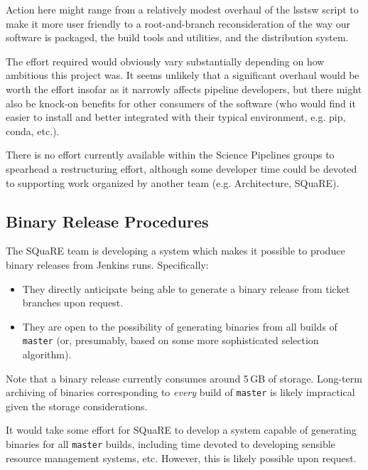 \documentclass[DM,toc]{lsstdoc}
\begin{document}
Action here might range from a relatively modest overhaul of the lsstsw script
to make it more user friendly to a root-and-branch reconsideration of the way
our software is packaged, the build tools and utilities, and the distribution
system.

The effort required would obviously vary substantially depending on how
ambitious this project was. It seems unlikely that a significant overhaul
would be worth the effort insofar as it narrowly affects pipeline developers,
but there might also be knock-on benefits for other consumers of the software
(who would find it easier to install and better integrated with their typical
environment, e.g. pip, conda, etc.).

There is no effort currently available within the Science Pipelines groups to
spearhead a restructuring effort, although some developer time could be
devoted to supporting work organized by another team (e.g. Architecture,
SQuaRE).

\subsection{Binary Release Procedures}
\label{sec:binaryrelease}

The SQuaRE team is developing a system which makes it possible to produce
binary releases from Jenkins runs. Specifically:

\begin{itemize}

  \item{They directly anticipate being able to generate a binary release from
  ticket branches upon request.}

  \item{They are open to the possibility of generating binaries from all
  builds of \texttt{master} (or, presumably, based on some more sophisticated
  selection algorithm).}

\end{itemize}

Note that a binary release currently consumes around 5\,GB of storage.
Long-term archiving of binaries corresponding to \textit{every} build of
\texttt{master} is likely impractical given the storage considerations.

It would take some effort for SQuaRE to develop a system capable of generating
binaries for all \texttt{master} builds, including time devoted to developing
sensible resource management systems, etc. However, this is likely possible
upon request.
\end{document}
